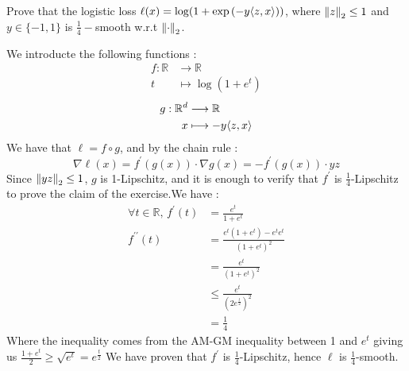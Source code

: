 \begin{exercise}[]{}
	Prove that the logistic loss $ \ell(x) = \log(1+\exp{(-y \langle z,x\rangle)}) $, where $ \left\|z\right\|_2 \leq  1 $ and $ y\in \{ -1,1 \} $ is $ \frac{1}{4}- $smooth w.r.t $ \left\|\cdot \right\|_2 $.
\end{exercise}

\begin{solution}[]
	We introducte the following functions :
\begin{align*}
f: \mathbb{R}& \longrightarrow \mathbb{R} \\
t&\longmapsto \log(1+e^t)
\end{align*}
\begin{align*}
g: \mathbb{R}^d& \longrightarrow \mathbb{R} \\
x&\longmapsto -y \langle z,x\rangle
\end{align*}
We have that $ \ell = f\circ g $, and by the chain rule :
\begin{equation*}
	\nabla \ell(x) = f^{\prime}(g(x))\cdot \nabla g(x) = -f^{\prime}(g(x))\cdot yz 
\end{equation*}
Since $ \left\|yz\right\|_2 \leq 1 $, $ g $ is 1-Lipschitz, and it is enough to verify that $ f^{\prime} $ is $ \frac{1}{4} $-Lipschitz to prove the claim of the exercise.We have :
\begin{align*}
	\forall t \in \mathbb{R},\, f^{\prime}(t) &= \frac{e^t}{1 +e^t} \\
	f^{\prime\prime}(t) &= \frac{e^{t}(1+e^{t}) - e^{t}e^{t}}{(1+e^{t})^2} \\
			    &= \frac{e^t}{(1+e^t)^2} \\
			    &\leq \frac{e^t}{(2e^{\frac{t}{2}})^2} \\
			    &= \frac{1}{4}
\end{align*}
Where the inequality comes from the AM-GM inequality between 1 and $ e^t $ giving us $ \frac{1 + e^t}{2} \geq \sqrt{e^t} = e^{\frac{t}{2}} $
We have proven that $ f^{\prime} $ is $ \frac{1}{4} $-Lipschitz, hence $ \ell $ is $ \frac{1}{4} $-smooth.
\end{solution}
